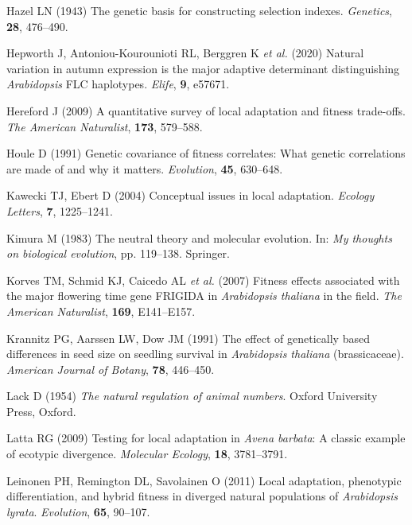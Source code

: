 \documentclass[]{article}
\begin{document}
\leavevmode\hypertarget{ref-Hazel1943}{}%
Hazel LN (1943) The genetic basis for constructing selection indexes. \emph{Genetics}, \textbf{28}, 476--490.

\leavevmode\hypertarget{ref-hepworth2020natural}{}%
Hepworth J, Antoniou-Kourounioti RL, Berggren K \emph{et al.} (2020) Natural variation in autumn expression is the major adaptive determinant distinguishing \emph{Arabidopsis} FLC haplotypes. \emph{Elife}, \textbf{9}, e57671.

\leavevmode\hypertarget{ref-Hereford2009}{}%
Hereford J (2009) A quantitative survey of local adaptation and fitness trade-offs. \emph{The American Naturalist}, \textbf{173}, 579--588.

\leavevmode\hypertarget{ref-Houle1991}{}%
Houle D (1991) Genetic covariance of fitness correlates: What genetic correlations are made of and why it matters. \emph{Evolution}, \textbf{45}, 630--648.

\leavevmode\hypertarget{ref-Kawecki2004}{}%
Kawecki TJ, Ebert D (2004) Conceptual issues in local adaptation. \emph{Ecology Letters}, \textbf{7}, 1225--1241.

\leavevmode\hypertarget{ref-kimura2020neutral}{}%
Kimura M (1983) The neutral theory and molecular evolution. In: \emph{My thoughts on biological evolution}, pp. 119--138. Springer.

\leavevmode\hypertarget{ref-korves2007fitness}{}%
Korves TM, Schmid KJ, Caicedo AL \emph{et al.} (2007) Fitness effects associated with the major flowering time gene FRIGIDA in \emph{Arabidopsis thaliana} in the field. \emph{The American Naturalist}, \textbf{169}, E141--E157.

\leavevmode\hypertarget{ref-krannitz1991effect}{}%
Krannitz PG, Aarssen LW, Dow JM (1991) The effect of genetically based differences in seed size on seedling survival in \emph{Arabidopsis thaliana} (brassicaceae). \emph{American Journal of Botany}, \textbf{78}, 446--450.

\leavevmode\hypertarget{ref-Lack1954}{}%
Lack D (1954) \emph{The natural regulation of animal numbers}. Oxford University Press, Oxford.

\leavevmode\hypertarget{ref-Latta2009}{}%
Latta RG (2009) Testing for local adaptation in \emph{Avena barbata}: A classic example of ecotypic divergence. \emph{Molecular Ecology}, \textbf{18}, 3781--3791.

\leavevmode\hypertarget{ref-leinonen2011local}{}%
Leinonen PH, Remington DL, Savolainen O (2011) Local adaptation, phenotypic differentiation, and hybrid fitness in diverged natural populations of \emph{Arabidopsis lyrata}. \emph{Evolution}, \textbf{65}, 90--107.
\end{document}
